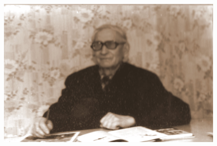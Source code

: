 \begin{figure}[h!]

    \begin{minipage}[h!]{0.16\paperwidth}
    \end{minipage}
    \hfill
   \begin{minipage}[h]{0.32\paperwidth}
       \includegraphics[width=\linewidth]{inc/Menshekovy/22.jpg} 

\end{minipage}
\end{figure}

